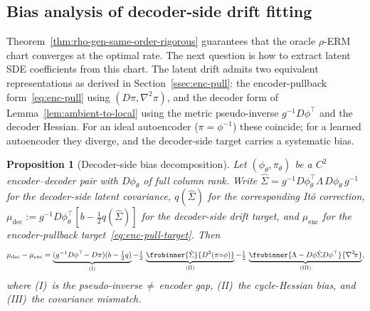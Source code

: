 \documentclass[11pt]{article}
\newtheorem{prop}[thm]{Proposition}
\begin{document}
\subsection{Bias analysis of decoder-side drift fitting}%
\label{ssec:bias-analysis}

Theorem~\ref{thm:rho-gen-same-order-rigorous} guarantees that the
oracle $\rho$-ERM chart converges at the optimal rate.
The next question is how to extract latent SDE coefficients from
this chart.
The latent drift admits two equivalent representations
as derived in Section~\ref{ssec:enc-pull}: the encoder-pullback
form~\eqref{eq:enc-pull} using $(D\pi, \nabla^2\pi)$, and the
decoder form of Lemma~\ref{lem:ambient-to-local} using the metric
pseudo-inverse $g^{-1}D\phi^\top$ and the decoder Hessian.
For an ideal autoencoder ($\pi=\phi^{-1}$) these coincide; for a
learned autoencoder they diverge, and the decoder-side target
carries a systematic bias.

\begin{prop}[Decoder-side bias decomposition]\label{prop:dec-bias}
  Let $(\phi_\theta,\pi_\theta)$ be a $C^2$ encoder--decoder pair
  with $D\phi_\theta$ of full column rank.
  Write $\hat\Sigma = g^{-1}D\phi_\theta^\top\Lambda\,D\phi_\theta\,g^{-1}$
  for the decoder-side latent covariance,
  $q(\hat\Sigma)$ for the corresponding It\^o correction,
  $\mu_{\mathrm{dec}} := g^{-1}D\phi_\theta^\top
  [b - \tfrac{1}{2}q(\hat\Sigma)]$
  for the decoder-side drift target, and
  $\mu_{\mathrm{enc}}$ for the encoder-pullback
  target~\eqref{eq:enc-pull-target}.
  Then
  \begin{equation}\label{eq:bias-decomposition}
    \mu_{\mathrm{dec}} - \mu_{\mathrm{enc}}
    = \underbrace{(g^{-1}D\phi^\top\!-D\pi)(b-\tfrac{1}{2}q)}_{\mathrm{(I)}}
    - \tfrac{1}{2}\,\underbrace{\frobinner{\hat\Sigma}{D^2(\pi\!\circ\!\phi)}}_{\mathrm{(II)}}
    - \tfrac{1}{2}\,\underbrace{\frobinner{\Lambda-D\phi\hat\Sigma D\phi^\top}{\nabla^2\!\pi}}_{\mathrm{(III)}},
  \end{equation}
  where (I)~is the pseudo-inverse\,${}\neq{}$\,encoder gap,
  (II)~the cycle-Hessian bias, and
  (III)~the covariance mismatch.
\end{prop}
\end{document}
